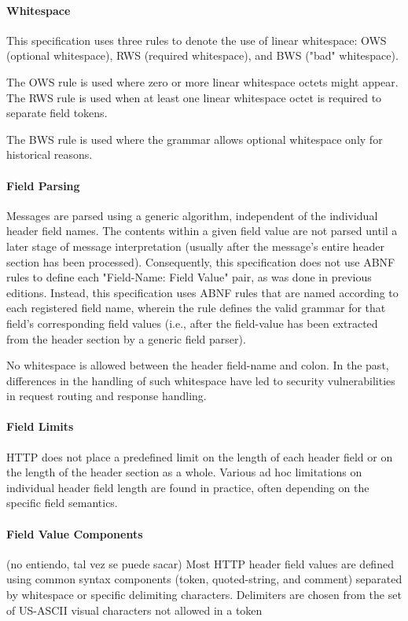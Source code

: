 \paragraph*{Whitespace}
This specification uses three rules to denote the use of linear
whitespace: OWS (optional whitespace), RWS (required whitespace), and
BWS ("bad" whitespace).

The OWS rule is used where zero or more linear whitespace octets
might appear.  
The RWS rule is used when at least one linear whitespace octet is
required to separate field tokens.  

The BWS rule is used where the grammar allows optional whitespace
only for historical reasons. 

\paragraph*{Field Parsing}
Messages are parsed using a generic algorithm, independent of the
individual header field names.  The contents within a given field
value are not parsed until a later stage of message interpretation
(usually after the message's entire header section has been
processed).  Consequently, this specification does not use ABNF rules
to define each "Field-Name: Field Value" pair, as was done in
previous editions.  Instead, this specification uses ABNF rules that
are named according to each registered field name, wherein the rule
defines the valid grammar for that field's corresponding field values
(i.e., after the field-value has been extracted from the header
section by a generic field parser).

No whitespace is allowed between the header field-name and colon.  In
the past, differences in the handling of such whitespace have led to
security vulnerabilities in request routing and response handling. 


\paragraph*{Field Limits }
HTTP does not place a predefined limit on the length of each header
field or on the length of the header section as a whole.  Various 
ad hoc limitations on individual header
field length are found in practice, often depending on the specific
field semantics.


\paragraph*{Field Value Components}
(no entiendo, tal vez se puede sacar)
Most HTTP header field values are defined using common syntax
components (token, quoted-string, and comment) separated by
whitespace or specific delimiting characters.  Delimiters are chosen
from the set of US-ASCII visual characters not allowed in a token

